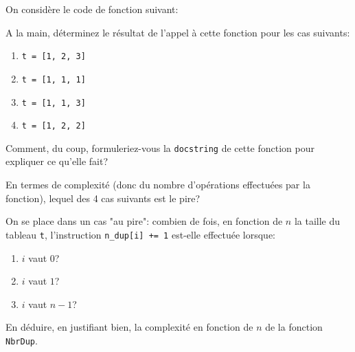 \documentclass[12pt]{article}
\begin{document}
	\begin{MonExo}
		On considère le code de fonction suivant:
		\begin{alphenum}
			\item A la main, déterminez le résultat de l'appel à cette fonction pour les cas suivants:
			\begin{enumerate}
				\item \texttt{t = [1, 2, 3]}
				\item \texttt{t = [1, 1, 1]}
				\item \texttt{t = [1, 1, 3]}
				\item \texttt{t = [1, 2, 2]}
			\end{enumerate}
			\item Comment, du coup, formuleriez-vous la \texttt{docstring} de cette fonction pour expliquer ce qu'elle fait?
			\item En termes de complexité (donc du nombre d'opérations effectuées par la fonction), lequel des 4 cas suivants est le pire?
			\item On se place dans un cas "au pire": combien de fois, en fonction de $n$ la taille du tableau \texttt{t}, l'instruction \texttt{n\_dup[i] += 1} est-elle effectuée lorsque:
			\begin{enumerate}
				\item $i$ vaut $0$?
				\item $i$ vaut $1$?
				\item $i$ vaut $n - 1$?
			\end{enumerate}
			\item En déduire, en justifiant bien, la complexité en fonction de $n$ de la fonction \texttt{NbrDup}.
		\end{alphenum}
	\end{MonExo}
\end{document}
